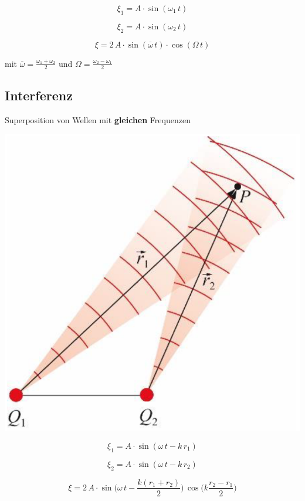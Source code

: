 \begin{minipage}{0.48\linewidth}
$$ \xi_1 = A \cdot \sin(\omega_1 \, t) $$
\end{minipage}
\hfill
\begin{minipage}{0.48\linewidth}
$$ \xi_2 = A \cdot \sin(\omega_2 \, t) $$
\end{minipage}

$$ \boxed{ \xi = 2 \, A \cdot \sin( \overline{\omega} \, t) \cdot \cos( \Omega \, t) }$$

mit $\overline{\omega} = \frac{\omega_1 + \omega_2}{2}$ und  $\Omega = \frac{\omega_2 - \omega_1}{2}$



\subsection{Interferenz}

Superposition von Wellen mit \textbf{gleichen} Frequenzen \\
\vspace{0.2cm}

\begin{minipage}{0.48\linewidth}
\includegraphics[width=0.7\linewidth]{Bilder/Wellen-Optik/interferenz} \\
\end{minipage}
\hfill
\begin{minipage}{0.48\linewidth}
$$ \xi_1 = A \cdot \sin(\omega \, t - k \, r_1) $$

$$ \xi_2 = A \cdot \sin(\omega \, t - k \, r_2) $$
\end{minipage}

$$ \boxed{ \xi = 2 \, A \cdot \sin \Big( \omega \, t - \frac{k (r_1 + r_2)}{2} \Big) \,  \cos \Big( k \frac{r_2 - r_1}{2}  \Big) } $$

